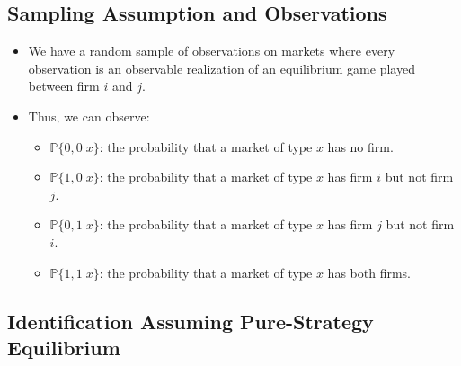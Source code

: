 \documentclass[]{book}
\providecommand{\tightlist}{%
  \setlength{\itemsep}{0pt}\setlength{\parskip}{0pt}}
\begin{document}
\subsection{Sampling Assumption and
Observations}\label{sampling-assumption-and-observations}

\begin{itemize}
\tightlist
\item
  We have a random sample of observations on markets where every
  observation is an observable realization of an equilibrium game played
  between firm \(i\) and \(j\).
\item
  Thus, we can observe:

  \begin{itemize}
  \tightlist
  \item
    \(\mathbb{P}\{0, 0|x\}\): the probability that a market of type
    \(x\) has no firm.
  \item
    \(\mathbb{P}\{1, 0|x\}\): the probability that a market of type
    \(x\) has firm \(i\) but not firm \(j\).
  \item
    \(\mathbb{P}\{0, 1|x\}\): the probability that a market of type
    \(x\) has firm \(j\) but not firm \(i\).
  \item
    \(\mathbb{P}\{1, 1|x\}\): the probability that a market of type
    \(x\) has both firms.
  \end{itemize}
\end{itemize}

\subsection{Identification Assuming Pure-Strategy
Equilibrium}\label{identification-assuming-pure-strategy-equilibrium}
\end{document}
